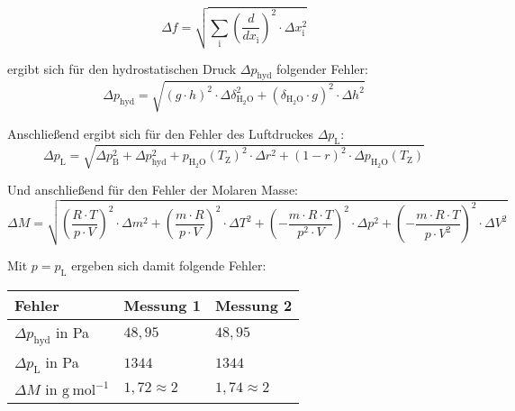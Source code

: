 \documentclass[12pt,a4paper,titlepage,headinclude,bibtotoc]{scrartcl}
\begin{document}
\begin{equation}
\Delta f = \sqrt{\sum_\mathrm{i} \left(\frac{d}{dx_\mathrm{i}}\right)^{2} \cdot \Delta x_\mathrm{i}^2}
\end{equation}


ergibt sich für den hydrostatischen Druck $\Delta p_\mathrm{hyd}$ folgender Fehler:\\

\begin{equation}
\Delta p_\mathrm{hyd} =  \sqrt{(g \cdot h)^2 \cdot \Delta \delta_\mathrm{H_2O}^2 + (\delta_\mathrm{H_2O} \cdot g)^2 \cdot \Delta h^2}
\end{equation}


Anschließend ergibt sich für den Fehler des Luftdruckes $\Delta p_\mathrm{L}$:\\


\begin{equation}
\Delta p_\mathrm{L} = \sqrt{\Delta p_\mathrm{B}^2 + \Delta p_\mathrm{hyd}^2 + p_\mathrm{H_2O}(T_\mathrm{Z})^2 \cdot \Delta r^2 + (1-r)^2 \cdot \Delta p_\mathrm{H_2O}(T_\mathrm{Z})}
\end{equation}

Und anschließend für den Fehler der Molaren Masse:\\

\begin{equation}
\Delta M = \sqrt{\left(\frac{R\cdot T}{p\cdot V}\right)^2 \cdot \Delta m^2 + \left(\frac{m\cdot R}{p\cdot V} \right)^2 \cdot \Delta T^2 + \left(-\frac{m\cdot R\cdot T}{p^2 \cdot V}\right)^2 \cdot \Delta p^2 + \left(-\frac{m \cdot R \cdot T}{p \cdot V^2} \right)^2 \cdot \Delta V^2}
\end{equation}

Mit $p = p_\mathrm{L}$ ergeben sich damit folgende Fehler:\\

\begin{table} [h]
\centering
\begin{tabular}{|p{4 cm}||p{4 cm}|p{4 cm}|}
        \hline
		Fehler & Messung 1 & Messung 2\\
         \hline 
        $\Delta p_\mathrm{hyd}$ in Pa & $48,95$  & $48,95$ \\
        \hline
        $\Delta p_\mathrm{L}   $ in Pa & $1344$  & $1344$ \\
        \hline
        $\Delta M $ in $\mathrm{g{~}mol^{-1}}$ & $1,72 \approx 2$ & $1,74 \approx 2$ \\
        \hline     
\end{tabular}
\end{table}
\end{document}

